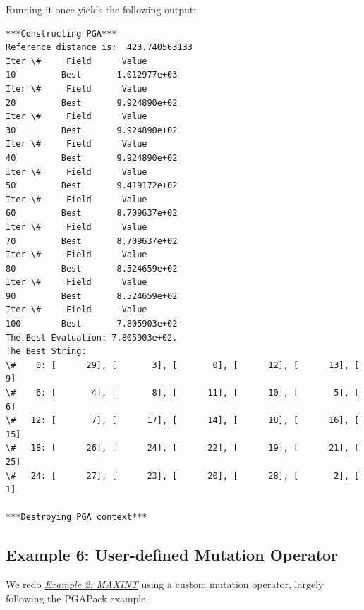 \documentclass[letterpaper,11pt,english]{sphinxmanual}
\begin{document}
Running it once yields the following output:

\begin{Verbatim}[commandchars=\\\{\}]
***Constructing PGA***
Reference distance is:  423.740563133
Iter \#     Field      Value
10         Best       1.012977e+03
Iter \#     Field      Value
20         Best       9.924890e+02
Iter \#     Field      Value
30         Best       9.924890e+02
Iter \#     Field      Value
40         Best       9.924890e+02
Iter \#     Field      Value
50         Best       9.419172e+02
Iter \#     Field      Value
60         Best       8.709637e+02
Iter \#     Field      Value
70         Best       8.709637e+02
Iter \#     Field      Value
80         Best       8.524659e+02
Iter \#     Field      Value
90         Best       8.524659e+02
Iter \#     Field      Value
100        Best       7.805903e+02
The Best Evaluation: 7.805903e+02.
The Best String:
\#    0: [      29], [       3], [       0], [      12], [      13], [       9]
\#    6: [       4], [       8], [      11], [      10], [       5], [       6]
\#   12: [       7], [      17], [      14], [      18], [      16], [      15]
\#   18: [      26], [      24], [      22], [      19], [      21], [      25]
\#   24: [      27], [      23], [      20], [      28], [       2], [       1]

***Destroying PGA context***
\end{Verbatim}


\subsection{Example 6: User-defined Mutation Operator}
\label{examples:sec-mutationexamples}\label{examples:example-6-user-defined-mutation-operator}
We redo {\hyperref[examples:sec-maxintexample]{\emph{Example 2: MAXINT}}} using a custom mutation
operator, largely following the PGAPack example.
\end{document}
